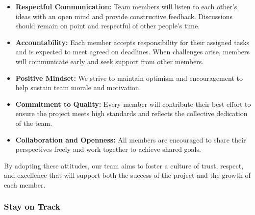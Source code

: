 \documentclass{article}
\begin{document}
\begin{itemize}
    \item \textbf{Respectful Communication:} Team members will listen to each
    other’s ideas with an open mind and provide constructive feedback.
    Discussions should remain on point and respectful of other people's time.

    \item \textbf{Accountability:} Each member accepts responsibility for their
    assigned tasks and is expected to meet agreed on deadlines. When
    challenges arise, members will communicate early and seek support from other members.

    \item \textbf{Positive Mindset:} We strive to maintain optimism and
    encouragement to help sustain team morale and motivation.

    \item \textbf{Commitment to Quality:} Every member will contribute their
    best effort to ensure the project meets high standards and reflects the
    collective dedication of the team.

    \item \textbf{Collaboration and Openness:} All members are encouraged to
    share their perspectives freely and work together to achieve shared goals.
\end{itemize}

By adopting these attitudes, our team aims to foster a culture of trust,
respect, and excellence that will support both the success of the project and
the growth of each member.

\subsubsection*{Stay on Track}

\iffalse
{}
\end{document}

